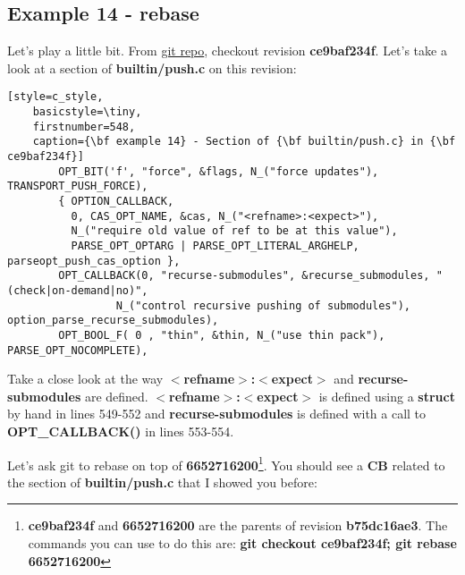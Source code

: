 \subsection{Example 14 - rebase}
\label{example_14}

Let's play a little bit. From \hyperref[git_repo]{git repo}, checkout revision {\bf ce9baf234f}. Let's take a look at a
section of {\bf builtin/push.c} on this revision:

\begin{lstlisting}[style=c_style,
	basicstyle=\tiny,
	firstnumber=548,
	caption={\bf example 14} - Section of {\bf builtin/push.c} in {\bf ce9baf234f}]
		OPT_BIT('f', "force", &flags, N_("force updates"), TRANSPORT_PUSH_FORCE),
		{ OPTION_CALLBACK,
		  0, CAS_OPT_NAME, &cas, N_("<refname>:<expect>"),
		  N_("require old value of ref to be at this value"),
		  PARSE_OPT_OPTARG | PARSE_OPT_LITERAL_ARGHELP, parseopt_push_cas_option },
		OPT_CALLBACK(0, "recurse-submodules", &recurse_submodules, "(check|on-demand|no)",
			     N_("control recursive pushing of submodules"), option_parse_recurse_submodules),
		OPT_BOOL_F( 0 , "thin", &thin, N_("use thin pack"), PARSE_OPT_NOCOMPLETE),
\end{lstlisting}

Take a close look at the way {\bf $<$refname$>$:$<$expect$>$} and {\bf recurse-submodules} are defined. {\bf $<$refname$>$:$<$expect$>$}
is defined using a {\bf struct} by hand in lines 549-552 and {\bf recurse-submodules} is defined with a call to {\bf OPT\_CALLBACK()}
in lines 553-554.

Let's ask git to rebase on top of {\bf 6652716200}\footnote{{\bf ce9baf234f} and {\bf 6652716200} are the parents of revision
{\bf b75dc16ae3}. The commands you can use to do this are: {\bf git checkout ce9baf234f; git rebase 6652716200}}. You should
see a {\bf CB} related to the section of {\bf builtin/push.c} that I showed you before:

